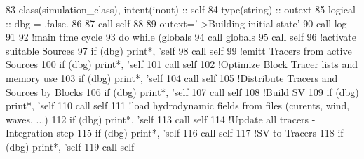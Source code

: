 \begin{DoxyCode}
83     \textcolor{keywordtype}{class}(simulation\_class), \textcolor{keywordtype}{intent(inout)} :: self
84     \textcolor{keywordtype}{type}(string) :: outext
85     \textcolor{keywordtype}{logical} :: dbg = .false.
86 
87     \textcolor{keyword}{call }self%
88     
89     outext=\textcolor{stringliteral}{'->Building initial state'}
90     \textcolor{keyword}{call }log%
91 
92     \textcolor{comment}{!main time cycle}
93     \textcolor{keywordflow}{do} \textcolor{keywordflow}{while} (globals%
94         \textcolor{keyword}{call }globals%
95         \textcolor{keyword}{call }self%
96         \textcolor{comment}{!activate suitable Sources}
97         \textcolor{keywordflow}{if} (dbg) print*, \textcolor{stringliteral}{'self%
98         \textcolor{keyword}{call }self%
99         \textcolor{comment}{!emitt Tracers from active Sources}
100         \textcolor{keywordflow}{if} (dbg) print*, \textcolor{stringliteral}{'self%
101         \textcolor{keyword}{call }self%
102         \textcolor{comment}{!Optimize Block Tracer lists and memory use}
103         \textcolor{keywordflow}{if} (dbg) print*, \textcolor{stringliteral}{'self%
104         \textcolor{keyword}{call }self%
105         \textcolor{comment}{!Distribute Tracers and Sources by Blocks}
106         \textcolor{keywordflow}{if} (dbg) print*, \textcolor{stringliteral}{'self%
107         \textcolor{keyword}{call }self%
108         \textcolor{comment}{!Build SV}
109         \textcolor{keywordflow}{if} (dbg) print*, \textcolor{stringliteral}{'self%
110         \textcolor{keyword}{call }self%
111         \textcolor{comment}{!load hydrodynamic fields from files (curents, wind, waves, ...)}
112         \textcolor{keywordflow}{if} (dbg) print*, \textcolor{stringliteral}{'self%
113         \textcolor{keyword}{call }self%
114         \textcolor{comment}{!Update all tracers - Integration step}
115         \textcolor{keywordflow}{if} (dbg) print*, \textcolor{stringliteral}{'self%
116         \textcolor{keyword}{call }self%
117         \textcolor{comment}{!SV to Tracers}
118         \textcolor{keywordflow}{if} (dbg) print*, \textcolor{stringliteral}{'self%
119         \textcolor{keyword}{call }self%
}}}}}}}}
\end{DoxyCode}
